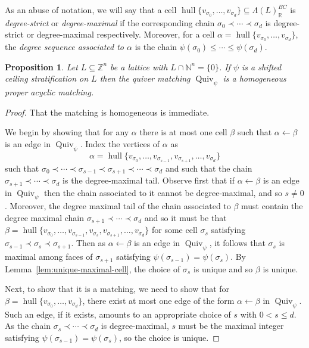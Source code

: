 \documentclass{amsart}
\newcommand{\NN}{\mathbb{N}}
\newcommand{\ZZ}{\mathbb{Z}}
\newcommand{\RR}{\mathbb{R}}
\newcommand{\Quiv}{\operatorname{Quiv}}
\DeclareMathOperator{\hull}{hull}
\newtheorem{proposition}[theorem]{Proposition}
\theoremstyle{remark}
\begin{document}
As an abuse of notation, we will say that a cell $\hull \{v_{\sigma_0},\ldots,v_{\sigma_d}\}\subseteq \Lambda(L)_{\RR}^{BC}$ is \emph{degree-strict} or \emph{degree-maximal} if the corresponding chain $\sigma_0\prec \cdots \prec \sigma_d$ is degree-strict or degree-maximal respectively. Moreover, for a cell $\alpha = \hull \{v_{\sigma_0},\ldots,v_{\sigma_d}\}$, the \emph{degree sequence associated to $\alpha$} is the chain $\psi(\sigma_0)\leq \cdots \leq \psi(\sigma_d)$.

\begin{proposition}
  Let $L\subseteq \ZZ^n$ be a lattice with $L \cap \NN^n=\{0\}$. If $\psi$ is a shifted ceiling stratification on $L$ then the quiver matching $\Quiv_\psi$ is a homogeneous proper acyclic matching.
\end{proposition}
\begin{proof}
  That the matching is homogeneous is immediate.

  We begin by showing that for any $\alpha$ there is at most one cell $\beta$ such that $\alpha \leftarrow \beta$ is an edge in $\Quiv_\psi$.
  Index the vertices of $\alpha$ as
  \[\alpha = \hull\{v_{\sigma_0},\ldots,v_{\sigma_{s-1}},v_{\sigma_{s+1}},\ldots,v_{\sigma_d}\}\]
  such that $\sigma_0\prec \cdots \prec \sigma_{s-1}\prec \sigma_{s+1}\prec \cdots \prec \sigma_d$
  and such that the chain $\sigma_{s+1}\prec \cdots\prec \sigma_d$ is the degree-maximal tail.
  Observe first that if $\alpha\leftarrow \beta$ is an edge in $\Quiv_\psi$ then the chain associated to it cannot be degree-maximal, and so $s\neq 0$. Moreover, the degree maximal tail of the chain associated to $\beta$ must contain the degree maximal chain $\sigma_{s+1}\prec \cdots \prec \sigma_d$ and so it must be that $\beta = \hull\{v_{\sigma_0},\ldots,v_{\sigma_{s-1}},v_{\sigma_s},v_{\sigma_{s+1}},\ldots,v_{\sigma_d}\}$ for some cell $\sigma_s$ satisfying $\sigma_{s-1}\prec \sigma_s \prec \sigma_{s+1}$. Then as $\alpha\leftarrow \beta$ is an edge in $\Quiv_\psi$, it follows that $\sigma_s$ is maximal among faces of $\sigma_{s+1}$ satisfying $\psi(\sigma_{s-1})=\psi(\sigma_s)$. By Lemma~\ref{lem:unique-maximal-cell}, the choice of $\sigma_s$ is unique and so $\beta$ is unique. 

  Next, to show that it is a matching, we need to show that for $\beta=\hull\{v_{\sigma_{0}},\ldots,v_{\sigma_d}\}$, there exist at most one edge of the form $\alpha \leftarrow \beta$ in $\Quiv_\psi$. Such an edge, if it exists, amounts to an appropriate choice of $s$ with $0<s\leq d$. As the chain $\sigma_{s}\prec \cdots \prec \sigma_d$ is degree-maximal, $s$ must be the maximal integer satisfying $\psi(\sigma_{s-1})=\psi(\sigma_s)$, so the choice is unique.


\end{proof}
\end{document}
